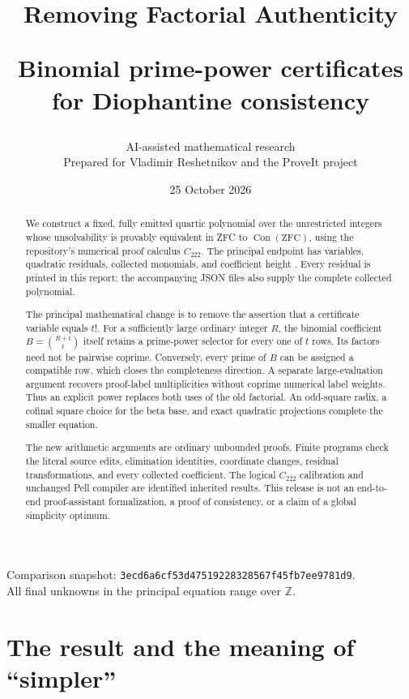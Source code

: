 \documentclass[11pt]{article}
\title{\color{ink}\bfseries Removing Factorial Authenticity\par
\large Binomial prime-power certificates for Diophantine consistency}
\author{AI-assisted mathematical research\smallskip\\
\normalsize Prepared for Vladimir Reshetnikov and the ProveIt project}
\date{25 October 2026}
\theoremstyle{definition}
\newcommand{\Z}{\mathbb Z}
\newcommand{\Con}{\operatorname{Con}}
\begin{document}
\maketitle
\thispagestyle{empty}
\begin{abstract}
We construct a fixed, fully emitted quartic polynomial over the unrestricted
integers whose unsolvability is provably equivalent in ZFC to
$\Con(\mathrm{ZFC})$, using the repository's numerical proof calculus
$C_{222}$. The principal endpoint has \NewVars{} variables,
\NewRows{} quadratic residuals, \NewTerms{} collected monomials, and
coefficient height \NewHeight{}. Every residual is printed in this report;
the accompanying JSON files also supply the complete collected polynomial.

The principal mathematical change is to remove the assertion that a
certificate variable equals $t!$. For a sufficiently large ordinary integer
$R$, the binomial coefficient $B=\binom{R+t}{t}$ itself retains a prime-power
selector for every one of $t$ rows. Its factors need not be pairwise coprime.
Conversely, every prime of $B$ can be assigned a compatible row, which closes
the completeness direction. A separate large-evaluation argument recovers
proof-label multiplicities without coprime numerical label weights. Thus an
explicit power replaces both uses of the old factorial. An odd-square radix,
a cofinal square choice for the beta base, and exact quadratic projections
complete the smaller equation.

The new arithmetic arguments are ordinary unbounded proofs. Finite programs
check the literal source edits, elimination identities, coordinate changes,
residual transformations, and every collected coefficient. The logical
$C_{222}$ calibration and unchanged Pell compiler are identified inherited
results. This release is not an end-to-end proof-assistant formalization,
a proof of consistency, or a claim of a global simplicity optimum.
\end{abstract}
\vfill
\begin{center}\small
Comparison snapshot: \texttt{3ecd6a6cf53d47519228328567f45fb7ee9781d9}.\\
All final unknowns in the principal equation range over $\Z$.
\end{center}
\newpage
\tableofcontents
\newpage

\section{The result and the meaning of ``simpler''}
\end{document}
